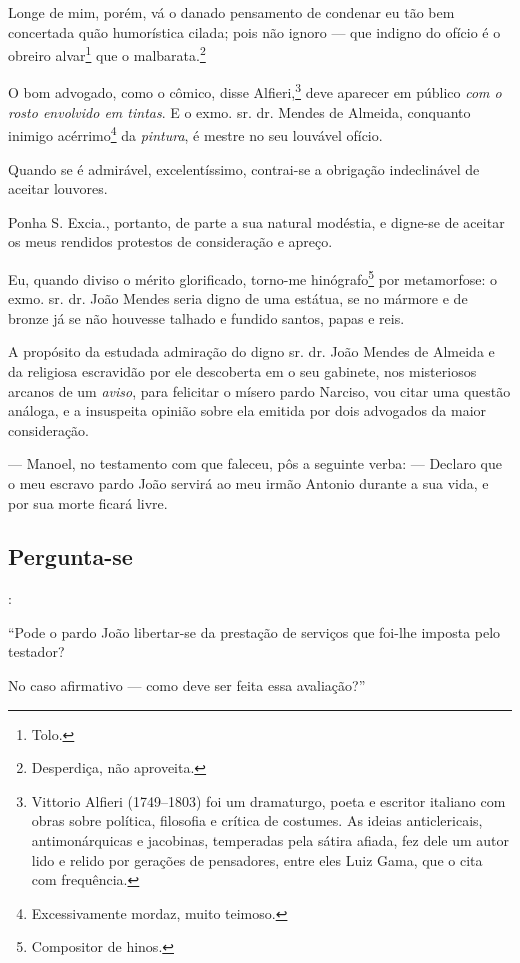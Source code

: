 {Longe de mim, porém, vá o danado pensamento de condenar eu tão bem
concertada quão humorística cilada; pois não ignoro --- que indigno do
ofício é o obreiro alvar\footnote{ Tolo.} que o
malbarata.\footnote{ Desperdiça, não aproveita.}

O bom advogado, como o cômico, disse
Alfieri,\footnote{ Vittorio Alfieri (1749--1803)
  foi um dramaturgo, poeta e escritor italiano com obras sobre política,
  filosofia e crítica de costumes. As ideias anticlericais,
  antimonárquicas e jacobinas, temperadas pela sátira afiada, fez dele
  um autor lido e relido por gerações de pensadores, entre eles Luiz
  Gama, que o cita com frequência.} deve aparecer em público \emph{com o
rosto envolvido em tintas}. E o exmo. sr. dr. Mendes de Almeida,
conquanto inimigo acérrimo\footnote{ Excessivamente mordaz, muito
  teimoso.} da \emph{pintura}, é mestre no seu louvável ofício.

Quando se é admirável, excelentíssimo, contrai-se a obrigação
indeclinável de aceitar louvores.

Ponha S. Excia., portanto, de parte a sua natural modéstia, e digne-se
de aceitar os meus rendidos protestos de consideração e apreço.

Eu, quando diviso o mérito glorificado, torno-me hinógrafo\footnote{
  Compositor de hinos.} por metamorfose: o exmo. sr. dr. João Mendes
seria digno de uma estátua, se no mármore e de bronze já se não houvesse
talhado e fundido santos, papas e reis.

A propósito da estudada admiração do digno sr. dr. João Mendes de
Almeida e da religiosa escravidão por ele descoberta em o seu gabinete,
nos misteriosos arcanos de um \emph{aviso}, para felicitar o mísero
pardo Narciso, vou citar uma questão análoga, e a insuspeita opinião
sobre ela emitida por dois advogados da maior consideração.

--- Manoel, no testamento com que faleceu, pôs a seguinte verba: ---
Declaro que o meu escravo pardo João servirá ao meu irmão Antonio
durante a sua vida, e por sua morte ficará livre.

\subsection{Pergunta-se}:

``Pode o pardo João libertar-se da prestação de serviços que foi-lhe
imposta pelo testador?

No caso afirmativo --- como deve ser feita essa avaliação?''

}
